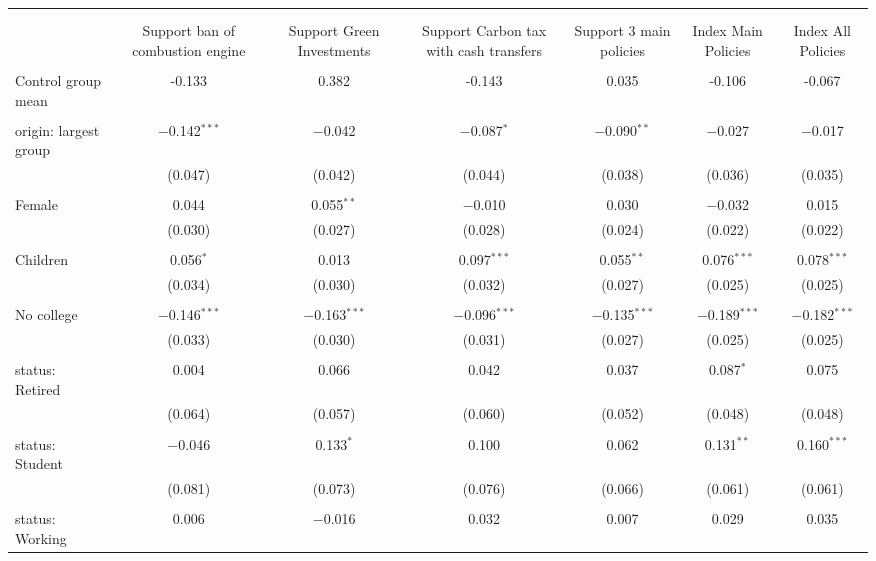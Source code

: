 
\begin{tabular}{@{\extracolsep{5pt}}lcccccc} 
\\[-1.8ex]\hline 
\hline \\[-1.8ex] 
\\[-1.8ex] & Support ban of combustion engine & Support Green Investments & Support Carbon tax 
 with cash transfers & Support 3 main policies & Index Main Policies & Index All Policies \\ 
\hline \\[-1.8ex] 
 Control group mean & -0.133 & 0.382 & -0.143 & 0.035 & -0.106 & -0.067  \\ \hline \\[-1.8ex] origin: largest group & $-$0.142$^{***}$ & $-$0.042 & $-$0.087$^{*}$ & $-$0.090$^{**}$ & $-$0.027 & $-$0.017 \\ 
  & (0.047) & (0.042) & (0.044) & (0.038) & (0.036) & (0.035) \\ 
  & & & & & & \\ 
 Female & 0.044 & 0.055$^{**}$ & $-$0.010 & 0.030 & $-$0.032 & 0.015 \\ 
  & (0.030) & (0.027) & (0.028) & (0.024) & (0.022) & (0.022) \\ 
  & & & & & & \\ 
 Children & 0.056$^{*}$ & 0.013 & 0.097$^{***}$ & 0.055$^{**}$ & 0.076$^{***}$ & 0.078$^{***}$ \\ 
  & (0.034) & (0.030) & (0.032) & (0.027) & (0.025) & (0.025) \\ 
  & & & & & & \\ 
 No college & $-$0.146$^{***}$ & $-$0.163$^{***}$ & $-$0.096$^{***}$ & $-$0.135$^{***}$ & $-$0.189$^{***}$ & $-$0.182$^{***}$ \\ 
  & (0.033) & (0.030) & (0.031) & (0.027) & (0.025) & (0.025) \\ 
  & & & & & & \\ 
 status: Retired & 0.004 & 0.066 & 0.042 & 0.037 & 0.087$^{*}$ & 0.075 \\ 
  & (0.064) & (0.057) & (0.060) & (0.052) & (0.048) & (0.048) \\ 
  & & & & & & \\ 
 status: Student & $-$0.046 & 0.133$^{*}$ & 0.100 & 0.062 & 0.131$^{**}$ & 0.160$^{***}$ \\ 
  & (0.081) & (0.073) & (0.076) & (0.066) & (0.061) & (0.061) \\ 
  & & & & & & \\ 
 status: Working & 0.006 & $-$0.016 & 0.032 & 0.007 & 0.029 & 0.035 \\ 

\end{tabular}
